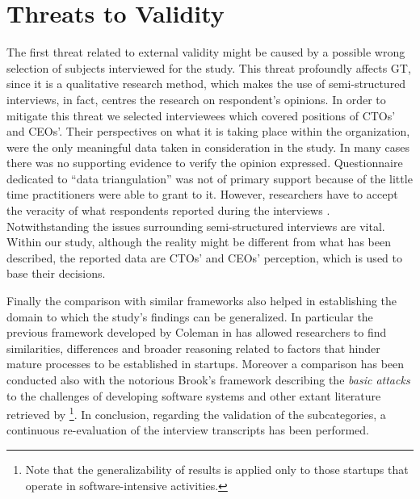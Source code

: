 \documentclass[10pt,journal,letterpaper,compsoc]{IEEEtran}
\begin{document}
\section{Threats to Validity}
\label{valt}

The first threat related to external validity might be caused by a possible 
wrong selection of subjects interviewed for the study. This threat profoundly 
affects GT, since it is a qualitative research method, which makes the use of 
semi-structured interviews, in fact, centres the research on respondent's 
opinions. In order to mitigate this threat we selected interviewees which 
covered positions of CTOs' and CEOs'. Their perspectives on what it is taking 
place within the organization, were the only meaningful data taken in 
consideration in the study.  In many cases there was no supporting evidence to 
verify the opinion expressed. Questionnaire dedicated to ``data triangulation'' 
was not of primary support because of the little time practitioners were able to 
grant to it. However, researchers have to accept the veracity of what 
respondents reported during the interviews \cite{Coleman2008a}. Notwithstanding 
the issues surrounding semi-structured interviews are vital. Within our study, 
although the reality might be different from what has been described, the 
reported data are CTOs' and CEOs' perception, which is used to base their 
decisions.

Finally the comparison with similar frameworks also helped in establishing the 
domain to which the study's findings can be generalized. In particular the 
previous framework developed by Coleman in \cite{Coleman2008} has allowed 
researchers to find similarities, differences and broader reasoning related to 
factors that hinder mature processes to be established in startups. Moreover a 
comparison has been conducted also with the notorious Brook's framework 
describing the \textit{basic attacks} to the challenges of developing software 
systems and other extant literature retrieved by \cite{SMS}\footnote{Note that 
the generalizability of results is applied only to those startups that operate 
in software-intensive activities.}. In conclusion, regarding the validation of 
the subcategories, a continuous re-evaluation of the interview transcripts has 
been performed.
\end{document}

